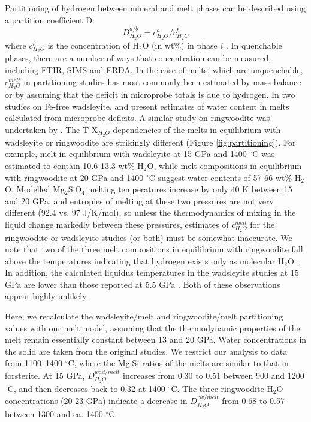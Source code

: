 \documentclass[review]{elsarticle}
\begin{document}
Partitioning of hydrogen between mineral and melt phases can be described using a partition coefficient D:
\begin{equation}
  D^{a/b}_{H_2O} = c^a_{H_2O} / c^b_{H_2O}
\end{equation}
where $c^i_{H_2O}$ is the concentration of H$_2$O (in wt\%) in phase $i$ \citep{KB2006}. In quenchable phases, there are a number of ways that concentration can be measured, including FTIR, SIMS and ERDA. In the case of melts, which are unquenchable, $c^{melt}_{H_2O}$ in partitioning studies has most commonly been estimated by mass balance or by assuming that the deficit in microprobe totals is due to hydrogen. In two studies on Fe-free wadsleyite, \cite{DDFK2005} and \cite{LSOK2011} present estimates of water content in melts calculated from microprobe deficits. A similar study on ringwoodite was undertaken by \cite{OMY2000}. The T-X$_{H_2O}$ dependencies of the melts in equilibrium with wadsleyite or ringwoodite are strikingly different (Figure \ref{fig:partitioning}). For example, melt in equilibrium with wadsleyite at 15 GPa and 1400 $^{\circ}$C was estimated to contain 10.6-13.3 wt\% H$_2$O, while melt compositions in equilibrium with ringwoodite at 20 GPa and 1400 $^{\circ}$C suggest water contents of 57-66 wt\% H$_2$O. Modelled Mg$_2$SiO$_4$ melting temperatures increase by only 40 K between 15 and 20 GPa, and entropies of melting at these two pressures are not very different (92.4 vs. 97 J/K/mol), so unless the thermodynamics of mixing in the liquid change markedly between these pressures, estimates of $c^{melt}_{H_2O}$ for the ringwoodite or wadsleyite studies (or both) must be somewhat inaccurate. We note that two of the three melt compositions in equilibrium with ringwoodite fall above the temperatures indicating that hydrogen exists only as molecular H$_2$O \citep{SS1985}. In addition, the calculated liquidus temperatures in the wadsleyite studies at 15 GPa are lower than those reported at 5.5 GPa \citep{Inoue1994}. Both of these observations appear highly unlikely.

Here, we recalculate the wadsleyite/melt and ringwoodite/melt partitioning values with our melt model, assuming that the thermodynamic properties of the melt remain essentially constant between 13 and 20 GPa. Water concentrations in the solid are taken from the original studies. We restrict our analysis to data from 1100--1400 $^{\circ}$C, where the Mg:Si ratios of the melts are similar to that in forsterite. At 15 GPa, $D^{wad/melt}_{H_2O}$ increases from 0.30 to 0.51 between 900 and 1200 $^{\circ}$C, and then decreases back to 0.32 at 1400 $^{\circ}$C. The three ringwoodite H$_2$O concentrations (20-23 GPa) indicate a decrease in $D^{rw/melt}_{H_2O}$ from 0.68 to 0.57 between 1300 and ca. 1400 $^{\circ}$C.
\end{document}
